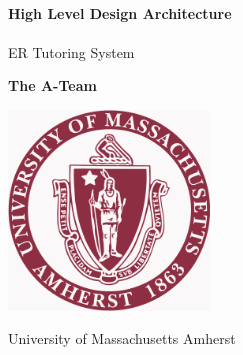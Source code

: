 \begin{titlepage}
    \begin{center}
        \vspace*{1cm}
        
 
        \HRule \\[0.4cm]
        {   \huge\textbf{High Level Design Architecture}\\[0.4cm] }
        \HRule \\[1cm]
       
        
        \vspace{0.5cm}
        \LARGE
        ER Tutoring System
        
        \vspace{1.5cm}
        
        \textbf{The A-Team}
        
        \vfill

        \vspace{0.8cm}
        
        \includegraphics[width=0.4\textwidth]{UMASS_logo}
        
        \Large
University of Massachusetts Amherst
        
    \end{center}
\end{titlepage}
